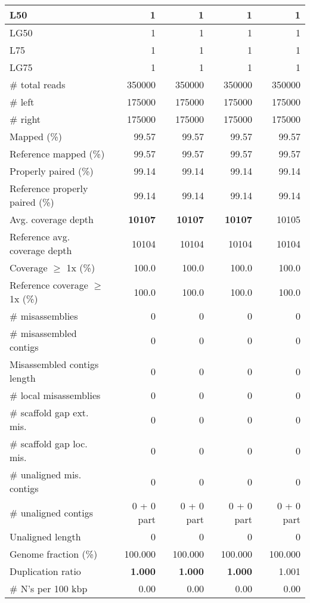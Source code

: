 \documentclass[12pt,a4paper]{article}
\begin{document}
\begin{table}[ht]
\begin{center}
\begin{tabular}{|l*{4}{|r}|}
L50 & 1 & 1 & 1 & 1 \\ \hline
LG50 & 1 & 1 & 1 & 1 \\ \hline
L75 & 1 & 1 & 1 & 1 \\ \hline
LG75 & 1 & 1 & 1 & 1 \\ \hline
\# total reads & 350000 & 350000 & 350000 & 350000 \\ \hline
\# left & 175000 & 175000 & 175000 & 175000 \\ \hline
\# right & 175000 & 175000 & 175000 & 175000 \\ \hline
Mapped (\%) & 99.57 & 99.57 & 99.57 & 99.57 \\ \hline
Reference mapped (\%) & 99.57 & 99.57 & 99.57 & 99.57 \\ \hline
Properly paired (\%) & 99.14 & 99.14 & 99.14 & 99.14 \\ \hline
Reference properly paired (\%) & 99.14 & 99.14 & 99.14 & 99.14 \\ \hline
Avg. coverage depth & {\bf 10107} & {\bf 10107} & {\bf 10107} & 10105 \\ \hline
Reference avg. coverage depth & 10104 & 10104 & 10104 & 10104 \\ \hline
Coverage $\geq$ 1x (\%) & 100.0 & 100.0 & 100.0 & 100.0 \\ \hline
Reference coverage $\geq$ 1x (\%) & 100.0 & 100.0 & 100.0 & 100.0 \\ \hline
\# misassemblies & 0 & 0 & 0 & 0 \\ \hline
\# misassembled contigs & 0 & 0 & 0 & 0 \\ \hline
Misassembled contigs length & 0 & 0 & 0 & 0 \\ \hline
\# local misassemblies & 0 & 0 & 0 & 0 \\ \hline
\# scaffold gap ext. mis. & 0 & 0 & 0 & 0 \\ \hline
\# scaffold gap loc. mis. & 0 & 0 & 0 & 0 \\ \hline
\# unaligned mis. contigs & 0 & 0 & 0 & 0 \\ \hline
\# unaligned contigs & 0 + 0 part & 0 + 0 part & 0 + 0 part & 0 + 0 part \\ \hline
Unaligned length & 0 & 0 & 0 & 0 \\ \hline
Genome fraction (\%) & 100.000 & 100.000 & 100.000 & 100.000 \\ \hline
Duplication ratio & {\bf 1.000} & {\bf 1.000} & {\bf 1.000} & 1.001 \\ \hline
\# N's per 100 kbp & 0.00 & 0.00 & 0.00 & 0.00 \\ \hline

\end{tabular}
\end{center}
\end{table}
\end{document}
